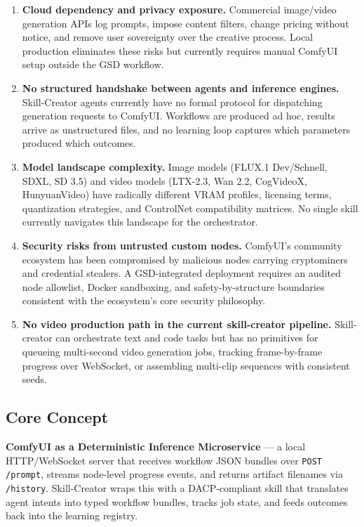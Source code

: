 \documentclass[11pt,letterpaper]{article}
\begin{document}
\begin{enumerate}
  \item \textbf{Cloud dependency and privacy exposure.} Commercial image/video generation
  APIs log prompts, impose content filters, change pricing without notice, and remove
  user sovereignty over the creative process. Local production eliminates these risks
  but currently requires manual ComfyUI setup outside the GSD workflow.

  \item \textbf{No structured handshake between agents and inference engines.}
  Skill-Creator agents currently have no formal protocol for dispatching generation
  requests to ComfyUI. Workflows are produced ad hoc, results arrive as unstructured
  files, and no learning loop captures which parameters produced which outcomes.

  \item \textbf{Model landscape complexity.} Image models (FLUX.1 Dev/Schnell, SDXL,
  SD 3.5) and video models (LTX-2.3, Wan 2.2, CogVideoX, HunyuanVideo) have radically
  different VRAM profiles, licensing terms, quantization strategies, and ControlNet
  compatibility matrices. No single skill currently navigates this landscape for the
  orchestrator.

  \item \textbf{Security risks from untrusted custom nodes.} ComfyUI's community
  ecosystem has been compromised by malicious nodes carrying cryptominers and credential
  stealers. A GSD-integrated deployment requires an audited node allowlist, Docker
  sandboxing, and safety-by-structure boundaries consistent with the ecosystem's core
  security philosophy.

  \item \textbf{No video production path in the current skill-creator pipeline.}
  Skill-creator can orchestrate text and code tasks but has no primitives for queueing
  multi-second video generation jobs, tracking frame-by-frame progress over WebSocket,
  or assembling multi-clip sequences with consistent seeds.
\end{enumerate}

\subsection{Core Concept}

\textbf{ComfyUI as a Deterministic Inference Microservice} --- a local HTTP/WebSocket
server that receives workflow JSON bundles over \texttt{POST /prompt}, streams node-level
progress events, and returns artifact filenames via \texttt{/history}. Skill-Creator
wraps this with a DACP-compliant skill that translates agent intents into typed workflow
bundles, tracks job state, and feeds outcomes back into the learning registry.
\end{document}
